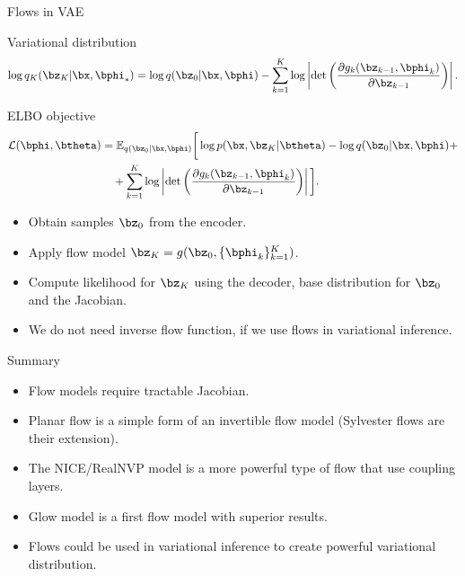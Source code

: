 \begin{frame}{Flows in VAE}
	\begin{block}{Variational distribution}
		\vspace{-0.6cm}
		\[
			\log q_K(\bz_K | \bx, \bphi_*) = \log q(\bz_0 | \bx, \bphi) - \sum_{k=1}^K \log \left| \det \left( \frac{\partial g_k(\bz_{k - 1}, \bphi_k)}{\partial \bz_{k-1}} \right) \right|.
		\]
		\vspace{-0.6cm}
	\end{block}
	\begin{block}{ELBO objective}
		\vspace{-0.7cm}
		\begin{align*}
			\mathcal{L} (\bphi, \btheta) 
			&= \mathbb{E}_{q(\bz_0 | \bx, \bphi)} \bigg[\log p(\bx, \bz_K | \btheta) -  \log q(\bz_0 | \bx, \bphi ) + \\ & \quad  + \sum_{k=1}^K \log \left| \det \left( \frac{\partial g_k(\bz_{k - 1}, \bphi_k)}{\partial \bz_{k-1}} \right) \right| \bigg].
		\end{align*}
		\vspace{-0.5cm}
	\end{block}
	\begin{itemize}
		\item Obtain samples $\bz_0$ from the encoder.
		\item Apply flow model $\bz_K = g(\bz_0, \{\bphi_k\}_{k = 1}^K)$.
		\item Compute likelihood for $\bz_K$ using the decoder, base distribution for $\bz_0$ and the Jacobian.
		\item We do not need inverse flow function, if we use flows in variational inference.
	\end{itemize}
\end{frame}
\begin{frame}{Summary}
\begin{itemize}
	\item Flow models require tractable Jacobian.
	\vfill
	\item Planar flow is a simple form of an invertible flow model (Sylvester flows are their extension). 
	\vfill
	\item The NICE/RealNVP model is a more powerful type of flow that use coupling layers.
	\vfill
	\item Glow model is a first flow model with superior results.
	\vfill
	\item Flows could be used in variational inference to create powerful variational distribution.

\end{itemize}
\end{frame}
 